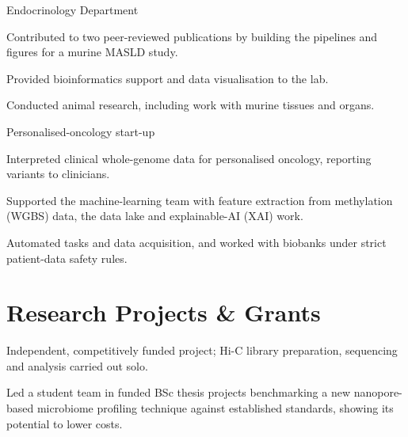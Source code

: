 \documentclass[]{deedy-resume-openfont}
\newcommand{\entrysep}{\vspace{6pt}}
\newcommand{\entrynote}[1]{{\footnotesize\color{headings}#1}\par}
\begin{document}
\entrynote{Endocrinology Department}
\begin{tightemize}
\item Contributed to two peer-reviewed publications by building the pipelines and figures for a murine MASLD study.
\item Provided bioinformatics support and data visualisation to the lab.
\item Conducted animal research, including work with murine tissues and organs.
\end{tightemize}
\entrysep

\entrynote{Personalised-oncology start-up}
\begin{tightemize}
\item Interpreted clinical whole-genome data for personalised oncology, reporting variants to clinicians.
\item Supported the machine-learning team with feature extraction from methylation (WGBS) data, the data lake and explainable-AI (XAI) work.
\item Automated tasks and data acquisition, and worked with biobanks under strict patient-data safety rules.
\end{tightemize}


\section{Research Projects \& Grants}

\begin{tightemize}
\item Independent, competitively funded project; Hi-C library preparation, sequencing and analysis carried out solo.
\end{tightemize}
\entrysep

\begin{tightemize}
\item Led a student team in funded BSc thesis projects benchmarking a new nanopore-based microbiome profiling technique against established standards, showing its potential to lower costs.
\end{tightemize}
\entrysep
\end{document}
